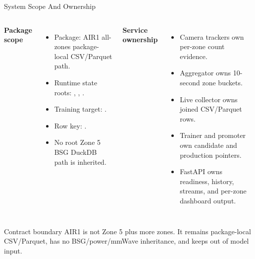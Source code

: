 \documentclass[aspectratio=169]{beamer}
\begin{document}
\begin{frame}[shrink=4]{System Scope And Ownership}
\begin{columns}[T,onlytextwidth]
\textbf{Package scope}
\begin{itemize}
  \item Package: AIR1 all-zones package-local CSV/Parquet path.
  \item Runtime state roots: , , .
  \item Training target: .
  \item Row key: .
  \item No root Zone 5 BSG DuckDB path is inherited.
\end{itemize}

\textbf{Service ownership}
\begin{itemize}
  \item Camera trackers own per-zone count evidence.
  \item Aggregator owns 10-second zone buckets.
  \item Live collector owns joined CSV/Parquet rows.
  \item Trainer and promoter own candidate and production pointers.
  \item FastAPI owns readiness, history, streams, and per-zone dashboard output.
\end{itemize}
\end{columns}
\tightsep
\begin{block}{Contract boundary}
\small AIR1 is not Zone 5 plus more zones. It remains package-local CSV/Parquet, has no BSG/power/mmWave inheritance, and keeps  out of model input.
\end{block}
\end{frame}
\end{document}
